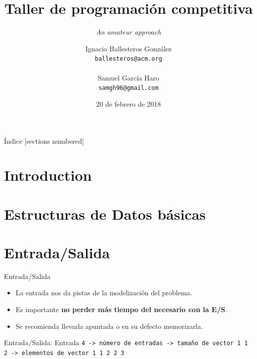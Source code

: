 \documentclass[10pt]{beamer}
\title{Taller de programación competitiva}
\subtitle{\textit{An amateur approach}}
\date{20 de febrero de 2018}
\author{
  Ignacio Ballesteros González\\
  {\color{mygray}\texttt{ballesteros@acm.org}\\}
  \\
  Samuel García Haro\\
  {\color{mygray}\texttt{samgh96@gmail.com}\\}
}
\institute{}
\begin{document}
\maketitle

\begin{frame}{Índice}
  [sections numbered]
  \tableofcontents[hideallsubsections]
\end{frame}

\section{Introduction}

\section{Estructuras de Datos básicas}

\section{Entrada/Salida}
\begin{frame}{Entrada/Salida}
  \begin{itemize}
  \item La entrada nos da pistas de la modelización del problema. \pause
  \item Es importante \textbf{no perder más tiempo del necesario con la E/S}. \pause
  \item Se recomienda llevarla apuntada o en su defecto memorizarla.
  \end{itemize}

\end{frame}


\begin{frame}{Entrada/Salida: Entrada}
  \texttt{4 -> número de entradas \newline {} -> tamaño de vector \newline {} 1 1 2 -> elementos de vector \newline {}  1   1 2 2 3 \newline
  }
\end{frame}
\end{document}
